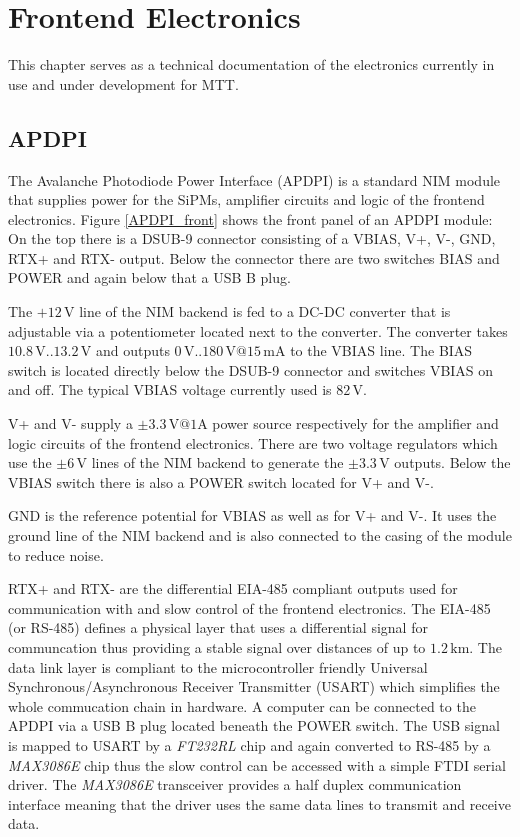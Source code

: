 \documentclass[]{article}
\begin{document}
\newpage
\section{Frontend Electronics}

This chapter serves as a technical documentation of the electronics currently in use and under development for MTT.

\subsection{APDPI}

The Avalanche Photodiode Power Interface (APDPI) is a standard NIM module that supplies power for the SiPMs, amplifier circuits and logic of the frontend electronics.
Figure \ref{APDPI_front} shows the front panel of an APDPI module: On the top there is a DSUB-9 connector consisting of a VBIAS, V+, V-, GND, RTX+ and RTX- output.
Below the connector there are two switches BIAS and POWER and again below that a USB B plug.

The $+12\,\text{V}$ line of the NIM backend is fed to a DC-DC converter that is adjustable via a potentiometer located next to the converter.
The converter takes $10.8\,\text{V} .. 13.2\,\text{V}$ and outputs $0\,\text{V} .. 180\,\text{V}@15\,\text{mA}$ to the VBIAS line. The BIAS switch is located directly below the
DSUB-9 connector and switches VBIAS on and off. The typical VBIAS voltage currently used is $82\,\text{V}$.

V+ and V- supply a $\pm3.3\,\text{V}@1\text{A}$ power source respectively for the amplifier and logic circuits of the frontend electronics. There are two voltage regulators 
which use the $\pm6\,\text{V}$ lines of the NIM backend to generate the $\pm3.3\,\text{V}$ outputs. Below the VBIAS switch there is also a POWER switch located for V+ and V-.

GND is the reference potential for VBIAS as well as for V+ and V-. It uses the ground line of the NIM backend and is also connected to the casing of the 
module to reduce noise.

RTX+ and RTX- are the differential EIA-485 compliant outputs used for communication with and slow control of the frontend electronics. The EIA-485 (or RS-485) 
defines a physical layer that uses a differential signal for communcation thus providing a stable signal over distances of up to $1.2\,\text{km}$. The data link layer is 
compliant to the microcontroller friendly Universal Synchronous/Asynchronous Receiver Transmitter (USART) which simplifies the whole commucation chain in hardware. 
A computer can be connected to the APDPI via a USB B plug located beneath the POWER switch. The USB signal is mapped to USART by a \emph{FT232RL} 
chip and again converted to RS-485 by a \emph{MAX3086E} chip thus the slow control can be accessed with a simple 
FTDI serial driver.
The \emph{MAX3086E} transceiver provides a half duplex communication interface meaning that the driver uses the same data lines to transmit and receive data.
\end{document}
